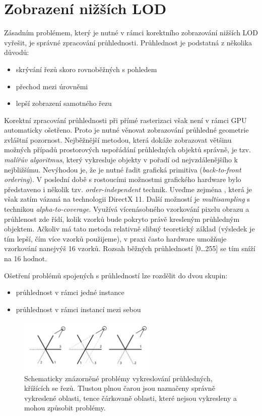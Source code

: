 \pagebreak
\section{Zobrazení nižších LOD}
\label{sec-LODdisplay}
Zásadním problémem, který je nutné v rámci korektního zobrazování nižších LOD vyřešit, je správné zpracování průhlednosti. Průhlednost je podstatná z několika důvodů:
\begin{itemize}
\item skrývání řezů skoro rovnoběžných s pohledem
\item přechod mezi úrovněmi
\item lepší zobrazení samotného řezu
\end{itemize}
Korektní zpracování průhlednosti při přímé rasterizaci však není v rámci GPU automaticky ošetřeno. Proto je nutné věnovat zobrazování průhledné geometrie zvláštní pozornost. Nejběžnější metodou, která dokáže zobrazovat většinu možných případů prostorových uspořádání průhledných objektů správně, je tzv. \emph{malířův algoritmus}, který vykresluje objekty v pořadí od nejvzdálenějšího k nejbližšímu. Nevýhodou je, že je nutné řadit grafická primitiva (\emph{back-to-front ordering}). V poslední době s rostoucími možnostmi grafického hardware bylo představeno i několik tzv. \emph{order-independent} %
 technik. Uveďme zejména \cite{order-independent}, která je však zatím vázaná na technologii DirectX 11. Další možností je \emph{multisampling} s technikou \emph{alpha-to-coverage}. Využívá vícenásobného vzorkování pixelu obrazu a průhlenost zde řídí, kolik vzorků bude pokryto právě kresleným průhledným objektem. Ačkoliv má tato metoda relativně slibný teoretický základ (výsledek je tím lepší, čím více vzorků použijeme), v praxi často hardware umožňuje vzorkování nanejvýš 16 vzorků. Rozsah běžných průhledností [0\dots255] se tím sníží na 16 hodnot.

Ošetření problémů spojených s průhledností lze rozdělit do dvou skupin:
\begin{itemize}
\item průhlednost v rámci jedné instance
\item průhlednost v rámci instancí mezi sebou
\end{itemize}

\begin{figure}[!hbt]
\begin{center}
\includegraphics[width=0.6\textwidth]{./figures/LODtransparency.png}
\end{center}
\caption[Průhlednost trsu řezů]%
{Schematicky znázorněné problémy vykreslování průhledných, křížících se řezů. Tlustou plnou čarou jsou naznačeny správně vykreslené oblasti, tence čárkovaně oblasti, které nejsou vykresleny a mohou způsobit problémy.
\label{fig:lodSliceOrdering}
}
\end{figure}

